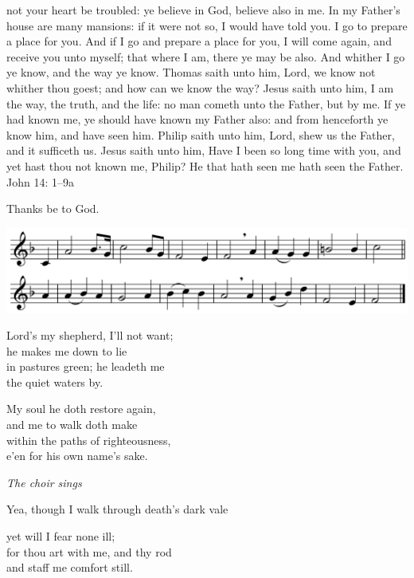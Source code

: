 
 not your heart be troubled: ye believe in God, believe also in me. In my Father’s
house are many mansions: if it were not so, I would have told you. I go to prepare
a place for you. And if I go and prepare a place for you, I will come again, and receive
you unto myself; that where I am, there ye may be also. And whither I go ye know, and
the way ye know. Thomas saith unto him, Lord, we know not whither thou goest; and
how can we know the way? Jesus saith unto him, I am the way, the truth, and the life:
no man cometh unto the Father, but by me. If ye had known me, ye should have known
my Father also: and from henceforth ye know him, and have seen him. Philip saith unto
him, Lord, shew us the Father, and it sufficeth us. Jesus saith unto him, Have I been so
long time with you, and yet hast thou not known me, Philip? He that hath seen me hath
seen the Father.
John 14: 1–9a

Thanks be to God.




\includegraphics[width=.8\textwidth]{hymn2.png}
\begin{center}

 Lord’s my shepherd, I’ll not want;\\
he makes me down to lie\\
in pastures green; he leadeth me\\
the quiet waters by.

My soul he doth restore again,\\
and me to walk doth make\\
within the paths of righteousness,\\
e’en for his own name’s sake.
\end{center}


\begin{minipage}[t]{0.3\textwidth}
\begin{flushleft}
\textcolor{qred}{\textit{The choir sings}}
\end{flushleft}
\end{minipage}\begin{minipage}[t]{0.7\textwidth}
\begin{flushleft}
Yea, though I walk through death’s dark vale\end{flushleft}
\end{minipage}\vspace{-.7em}\begin{center}
yet will I fear none ill;\\ for thou art with me, and thy rod\\
and staff me comfort still.\end{center}

